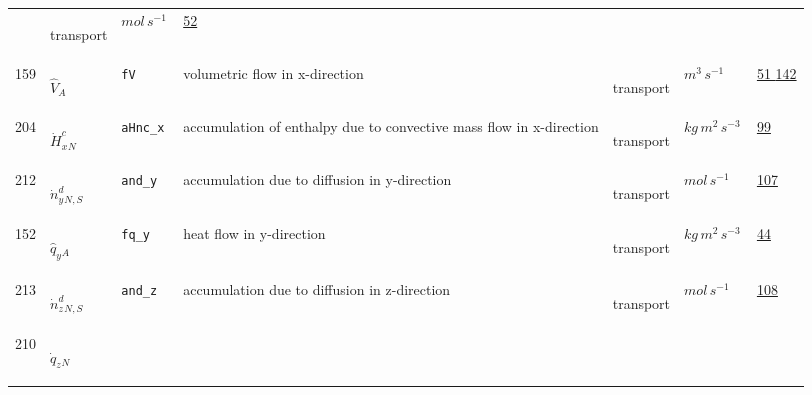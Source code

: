\begin{longtable}{|p{1cm}|p{2.5cm}|p{4.5cm}|p{8cm}|p{3.0cm}|p{3cm}|p{1cm}|}
             & \begin{lay}transport \end{lay}
             & $ mol \,s^{-1} \, $
             &                 \hyperlink{"e:52"}{ 52 }
                 \\
            159
             & \hypertarget{"v:159"}{ $ {{\hat{V}}}{_{A}} $}
             & \verb|fV|
             & volumetric flow in x-direction
             & \begin{lay}transport \end{lay}
             & $ m^{3} \,s^{-1} \, $
             &                 \hyperlink{"e:51"}{ 51 }
                                 \hyperlink{"e:142"}{ 142 }
                 \\
            204
             & \hypertarget{"v:204"}{ $ {{\dot{H}^c_x}}{_{N}} $}
             & \verb|aHnc_x|
             & accumulation of enthalpy due to convective mass flow in x-direction
             & \begin{lay}transport \end{lay}
             & $ kg \,m^{2} \,s^{-3} \, $
             &                 \hyperlink{"e:99"}{ 99 }
                 \\
            212
             & \hypertarget{"v:212"}{ $ {{\dot{n}^d_y}}{_{N, S}} $}
             & \verb|and_y|
             & accumulation due to diffusion in y-direction
             & \begin{lay}transport \end{lay}
             & $ mol \,s^{-1} \, $
             &                 \hyperlink{"e:107"}{ 107 }
                 \\
            152
             & \hypertarget{"v:152"}{ $ {{\hat{q}_y}}{_{A}} $}
             & \verb|fq_y|
             & heat flow in y-direction
             & \begin{lay}transport \end{lay}
             & $ kg \,m^{2} \,s^{-3} \, $
             &                 \hyperlink{"e:44"}{ 44 }
                 \\
            213
             & \hypertarget{"v:213"}{ $ {{\dot{n}^d_z}}{_{N, S}} $}
             & \verb|and_z|
             & accumulation due to diffusion in z-direction
             & \begin{lay}transport \end{lay}
             & $ mol \,s^{-1} \, $
             &                 \hyperlink{"e:108"}{ 108 }
                 \\
            210
             & \hypertarget{"v:210"}{ $ {{\dot{q}_z}}{_{N}} $}

\end{longtable}
